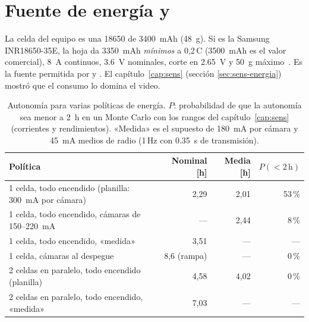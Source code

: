 \section{Fuente de energía y \texorpdfstring{}{E7}}\label{sec:sens-bat}

La celda del equipo es una 18650 de \SI{3400}{mAh} (\SI{48}{g}). Si es la Samsung INR18650-35E,
la hoja da \SI{3350}{mAh} \emph{mínimos} a 0,2\,C (\SI{3500}{mAh} es el valor comercial), \SI{8}{A}
continuos, \SI{3.6}{V} nominales, corte en \SI{2.65}{V} y \SI{50}{g} máximo~\cite{sensores-samsung35e}.
Es la fuente permitida por  y . El capítulo~\ref{cap:sens} (sección
\ref{sec:sens-energia}) mostró que el consumo lo domina el video.

\begin{table}[H]
\centering\small
\caption{Autonomía para varias políticas de energía. $P$: probabilidad de que
la autonomía sea menor a \SI{2}{h} en un Monte Carlo con los rangos del capítulo~\ref{cap:sens}
(corrientes y rendimientos). «Medida» es el supuesto de \SI{180}{mA} por cámara y \SI{45}{mA} medios de radio
(1\,Hz con \SI{0.35}{s} de transmisión).}\label{tab:sens-energia2}
\begin{tabular}{@{}lrrr@{}}
\toprule
\textbf{Política} & \textbf{Nominal} [h] & \textbf{Media} [h] & \textbf{$P(<2\,\text{h})$}\\\midrule
1 celda, todo encendido (planilla: \SI{300}{mA} por cámara) & 2,29 & 2,01 & 53\,\%\\
1 celda, todo encendido, cámaras de 150--\SI{220}{mA} & --- & 2,44 & 8\,\%\\
1 celda, todo encendido, «medida» & 3,51 & --- & ---\\
1 celda, cámaras al despegue & 8,6 (rampa) & --- & 0\,\%\\
2 celdas en paralelo, todo encendido (planilla) & 4,58 & 4,02 & 0\,\%\\
2 celdas en paralelo, todo encendido, «medida» & 7,03 & --- & ---\\
\bottomrule
\end{tabular}
\end{table}

\begin{table}[H]
\centering\small
\caption{Decisión de la fuente de energía.}\label{tab:sens-bat}

\end{table}

